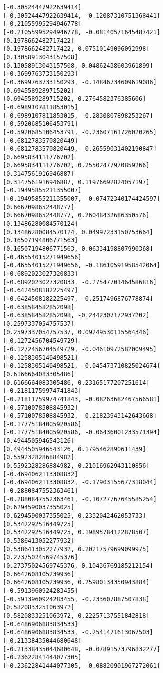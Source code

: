 \documentclass[11pt]{article}
\begin{document}
\begin{Verbatim}[commandchars=\\\{\}]
[-0.30524447922639414]
[-0.30524447922639414, -0.12087310751368441]
[-0.21055995294946778]
[-0.21055995294946778, -0.08140571645487421]
[0.1978662482717422]
[0.1978662482717422, 0.07510149096092998]
[0.13058913043157508]
[0.13058913043157508, 0.04862438603961899]
[-0.3699763733150293]
[-0.3699763733150293, -0.14846734609619086]
[0.6945589289715202]
[0.6945589289715202, 0.2764582376385606]
[-0.6989107811853015]
[-0.6989107811853015, -0.2830807898253267]
[-0.5920685106453791]
[-0.5920685106453791, -0.23607161726020265]
[-0.6812783570820449]
[-0.6812783570820449, -0.26559031402190847]
[0.6695834111776702]
[0.6695834111776702, 0.25502477970859266]
[0.3147561916946887]
[0.3147561916946887, 0.11976692824057197]
[-0.19495855211355007]
[-0.19495855211355007, -0.07472340174424597]
[0.6667098652448777]
[0.6667098652448777, 0.26048432686350576]
[0.13486280084570124]
[0.13486280084570124, 0.04997233150753664]
[0.16507194806771563]
[0.16507194806771563, 0.06334198807990368]
[-0.46554015271949656]
[-0.46554015271949656, -0.18610591958542064]
[-0.6892023027320833]
[-0.6892023027320833, -0.27547701464586816]
[-0.6424508182225497]
[-0.6424508182225497, -0.2517496876778874]
[-0.638584582852098]
[-0.638584582852098, -0.2442307172937202]
[0.2597337054757537]
[0.2597337054757537, 0.09249530115564346]
[-0.1272456704549729]
[-0.1272456704549729, -0.04610972582009495]
[-0.1258305140498521]
[-0.1258305140498521, -0.045473710825024674]
[0.6166664083305486]
[0.6166664083305486, 0.23165177207251614]
[-0.21811759974741843]
[-0.21811759974741843, -0.08263682467566581]
[-0.5710078508845932]
[-0.5710078508845932, -0.21823943142643668]
[-0.17775184005920586]
[-0.17775184005920586, -0.06436001233571394]
[0.4944505946543126]
[0.4944505946543126, 0.1795462890611439]
[0.5592328286884982]
[0.5592328286884982, 0.21016962943110856]
[-0.4694062113308832]
[-0.4694062113308832, -0.17903155677318044]
[-0.2880847552363461]
[-0.2880847552363461, -0.10727767645585254]
[0.6294590037355025]
[0.6294590037355025, 0.2332042462053733]
[0.5342292516449725]
[0.5342292516449725, 0.19895784122878507]
[0.5386413052277932]
[0.5386413052277932, 0.20217579699099975]
[0.27375024569745376]
[0.27375024569745376, 0.10436769185212154]
[0.6642608105239936]
[0.6642608105239936, 0.25980134350943884]
[-0.5913960924283455]
[-0.5913960924283455, -0.233607887507838]
[0.5820833251063972]
[0.5820833251063972, 0.22257137551842818]
[-0.6486906883834533]
[-0.6486906883834533, -0.2541471613067503]
[-0.21338435044680648]
[-0.21338435044680648, -0.07891573796832277]
[-0.23622841444077305]
[-0.23622841444077305, -0.08820901967272061]

\end{Verbatim}
\end{document}
